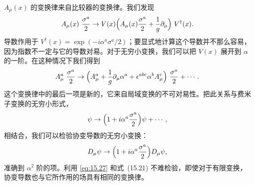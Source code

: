 $A_\mu(x)$ 的变换律来自比较器的变换律。我们发现
\begin{equation}
  A_\mu(x)\ \frac{\sigma^a}{2} \to V(x)\Bigl( A_\mu(x)\frac{\sigma^a}{2}
    + \frac{1}{g}\partial_\mu \Bigr)\ V^{\dagger}(x) .
  \label{eq:15.27}
\end{equation}
导数作用于 $V^{\dagger}(x) = \exp(-i\alpha^a\sigma^a/2)$；要显式地计算这个导数并不那么容易，因为指数不一定与它的导数对易。对于无穷小变换，我们可以把 $V(x)$ 展开到 $\alpha$ 的一阶。在这种情况下我们得到
\begin{equation}
  A_\mu^a\ \frac{\sigma^a}{2} \to \Bigl( A_\mu^a + \frac{1}{g}\partial_\mu\alpha^a
    + \epsilon^{abc}\alpha^b A_\mu^c \Bigr)\ \frac{\sigma^a}{2} + \cdots .
  \label{eq:15.28}
\end{equation}
这个变换律中的最后一项是新的，它来自局域变换的不可对易性。把此关系与费米子变换的无穷小形式，
\begin{equation}
  \psi \to \Bigl( 1 + i\alpha^a\frac{\sigma^a}{2} \Bigr)\psi + \cdots ,
  \label{eq:15.29}
\end{equation}
相结合，我们可以检验协变导数的无穷小变换：
\begin{equation}
  D_\mu\psi \to \Bigl( 1 + i\alpha^a\frac{\sigma^a}{2} \Bigr)D_\mu\psi ,
  \label{eq:15.30}
\end{equation}
准确到 $\alpha^2$ 阶的项。利用 \eqref{eq:15.27} 和式~(15.21) 不难检验，即使对于有限变换，协变导数也与它所作用的场具有相同的变换律。

